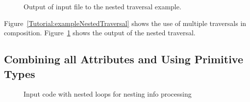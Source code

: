 \begin{figure}[!h]
{\indent
{\mySmallFontSize

\begin{latexonly}
   
\end{latexonly}

\begin{htmlonly}
   
\end{htmlonly}

}
}
\caption{Output of input file to the nested traversal example.}
\label{Tutorial:exampleOutput_NestedTraversal}
\end{figure}

     Figure~\ref{Tutorial:exampleNestedTraversal} shows the use of multiple 
traversals in composition. Figure~\ref{Tutorial:exampleOutput_NestedTraversal}
shows the output of the nested traversal.





\clearpage
\subsection{Combining all Attributes and Using Primitive Types}

\begin{figure}[!h]
{\indent
{\mySmallFontSize


\begin{latexonly}
   
\end{latexonly}

\begin{htmlonly}
   
\end{htmlonly}
}
}
\caption{Input code with nested loops for nesting info processing}
\label{Tutorial:exampleInputCode_ExampleLoopNestingInfoProcessing}
\end{figure}

